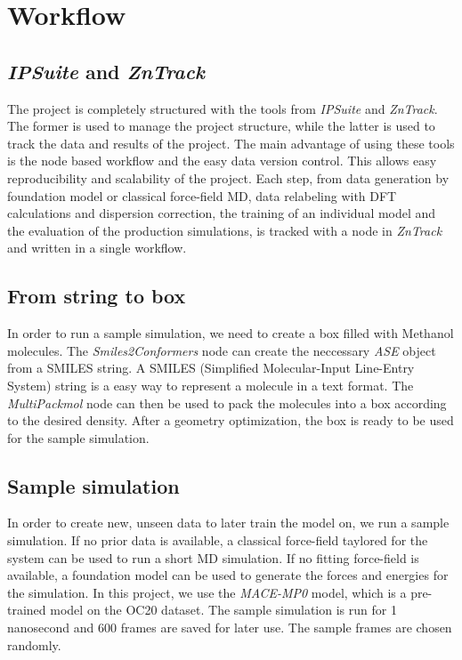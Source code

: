 \section{Workflow}

\subsection{\textit{IPSuite} and \textit{ZnTrack}}

The project is completely structured with the tools from \textit{IPSuite} and \textit{ZnTrack}. The former is used to manage the project structure, while the latter is used to track the data and results of the project. The main advantage of using these tools is the node based workflow and the easy data version control. This allows easy reproducibility and scalability of the project. Each step, from data generation by foundation model or classical force-field MD, data relabeling with DFT calculations and dispersion correction, the training of an individual model and the evaluation of the production simulations, is tracked with a node in \textit{ZnTrack} and written in a single workflow.

\subsection{From string to box}
In order to run a sample simulation, we need to create a box filled with Methanol molecules. The \textit{Smiles2Conformers} node can create the neccessary \textit{ASE} object from a SMILES string.
A SMILES (Simplified Molecular-Input Line-Entry System) string is a easy way to represent a molecule in a text format.
The \textit{MultiPackmol} node can then be used to pack the molecules into a box according to the desired density. After a geometry optimization, the box is ready to be used for the sample simulation.

\subsection{Sample simulation}
In order to create new, unseen data to later train the model on, we run a sample simulation. If no prior data is available, a classical force-field taylored for the system can be used to run a short MD simulation. If no fitting force-field is available, a foundation model can be used to generate the forces and energies for the simulation. In this project, we use the \textit{MACE-MP0} model, which is a pre-trained model on the OC20 dataset. The sample simulation is run for 1 nanosecond and 600 frames are saved for later use. The sample frames are chosen randomly.

